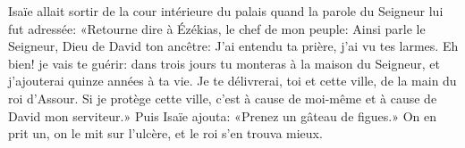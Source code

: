 Isaïe allait sortir de la cour intérieure du palais
	quand la parole du Seigneur lui fut adressée:
«Retourne dire à Ézékias, le chef de mon peuple:
	Ainsi parle le Seigneur, Dieu de David ton ancêtre:
	J’ai entendu ta prière, j’ai vu tes larmes.
Eh bien! je vais te guérir: dans trois jours tu monteras à la maison du Seigneur,
	et j’ajouterai quinze années à ta vie.
Je te délivrerai, toi et cette ville, de la main du roi d’Assour.
Si je protège cette ville, c’est à cause de moi-même et à cause de David mon serviteur.»
Puis Isaïe ajouta: «Prenez un gâteau de figues.»
	On en prit un, on le mit sur l’ulcère, et le roi s’en trouva mieux.
